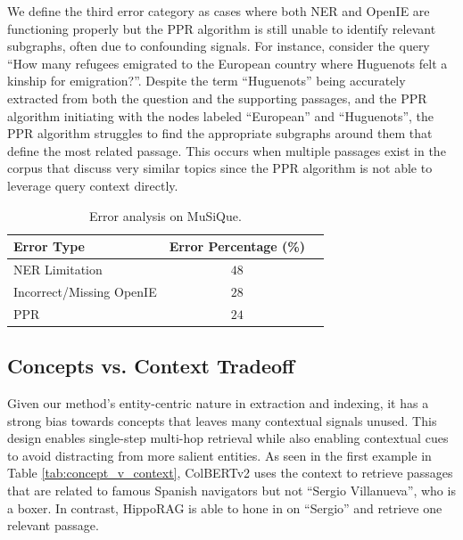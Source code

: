 \documentclass{article}
\begin{document}
\begin{appendices}
We define the third error category as cases where both NER and OpenIE are functioning properly but the PPR algorithm is still unable to identify relevant subgraphs, often due to confounding signals. For instance, consider the query ``How many refugees emigrated to the European country where Huguenots felt a kinship for emigration?''.
Despite the term ``Huguenots'' being accurately extracted from both the question and the supporting passages, and the PPR algorithm initiating with the nodes labeled ``European'' and ``Huguenots'', the PPR algorithm struggles to find the appropriate subgraphs around them that define the most related passage. This occurs when multiple passages exist in the corpus that discuss very similar topics since the PPR algorithm is not able to leverage query context directly.

\begin{table}[!ht]
\small
  \caption{Error analysis on MuSiQue.}
  \label{tab:musique error}
  \centering
\begin{tabular}{@{}lcc@{}}
\toprule
\textbf{Error Type} & \textbf{Error Percentage} (\%)\\ \midrule
NER Limitation & $48$  \\ 
Incorrect/Missing OpenIE & $28$ \\
PPR & $24$  \\
 \bottomrule
\end{tabular}
\end{table}

\subsection{Concepts vs. Context Tradeoff}
\label{subsec:concepts and context tradeoff}

Given our method's entity-centric nature in extraction and indexing, it has a strong bias towards concepts that leaves many contextual signals unused. This design enables single-step multi-hop retrieval while also enabling contextual cues to avoid distracting from more salient entities. As seen in the first example in Table \ref{tab:concept_v_context}, ColBERTv2 uses the context to retrieve passages that are related to famous Spanish navigators but not ``Sergio Villanueva'', who is a boxer. In contrast, HippoRAG is able to hone in on ``Sergio'' and retrieve one relevant passage. 


\end{appendices}
\end{document}

